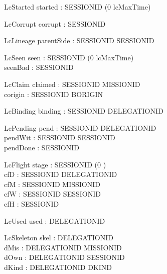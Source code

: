 \documentclass[a4paper,10pt,fleqn]{article}
\begin{document}
\begin{schema}{LcStarted}
started : SESSIONID \pfun (0 \upto lcMaxTime)
\end{schema}

\begin{schema}{LcCorrupt}
corrupt : \power SESSIONID
\end{schema}

\begin{schema}{LcLineage}
parentSide : SESSIONID \pfun SESSIONID
\end{schema}

\begin{schema}{LcSeen}
seen : SESSIONID \pfun (0 \upto lcMaxTime) \\
seenBad : \power SESSIONID
\end{schema}

\begin{schema}{LcClaim}
claimed : SESSIONID \pfun MISSIONID \\
corigin : SESSIONID \pfun BORIGIN
\end{schema}

\begin{schema}{LcBinding}
binding : SESSIONID \pfun DELEGATIONID
\end{schema}

\begin{schema}{LcPending}
pend : SESSIONID \pfun DELEGATIONID \\
pendWit : SESSIONID \pfun SESSIONID \\
pendDone : \power SESSIONID
\end{schema}

\begin{schema}{LcFlight}
stage : SESSIONID \pfun (0 ) \\
cfD : SESSIONID \pfun DELEGATIONID \\
cfM : SESSIONID \pfun MISSIONID \\
cfW : SESSIONID \pfun SESSIONID \\
cfH : \power SESSIONID
\end{schema}

\begin{schema}{LcUsed}
used : \power DELEGATIONID
\end{schema}

\begin{schema}{LcSkeleton}
skel : \power DELEGATIONID \\
dMis : DELEGATIONID \pfun MISSIONID \\
dOwn : DELEGATIONID \pfun SESSIONID \\
dKind : DELEGATIONID \pfun DKIND
\end{schema}
\end{document}
